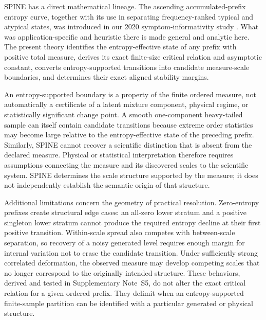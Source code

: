 \documentclass[aip,cha,reprint,superscriptaddress,floatfix]{revtex4-2}
\theoremstyle{definition}
\theoremstyle{remark}
\begin{document}
SPINE has a direct mathematical lineage. The ascending accumulated-prefix entropy curve, together with its use in separating frequency-ranked typical and atypical states, was introduced in our 2020 symptom-informativity study \cite{almomani2020symptoms}. What was application-specific and heuristic there is made general and analytic here. The present theory identifies the entropy-effective state of any prefix with positive total measure, derives its exact finite-size critical relation and asymptotic constant, converts entropy-supported transitions into candidate measure-scale boundaries, and determines their exact aligned stability margins. 

An entropy-supported boundary is a property of the finite ordered measure, not automatically a certificate of a latent mixture component, physical regime, or statistically significant change point. A smooth one-component heavy-tailed sample can itself contain candidate transitions because extreme order statistics may become large relative to the entropy-effective state of the preceding prefix. Similarly, SPINE cannot recover a scientific distinction that is absent from the declared measure. Physical or statistical interpretation therefore requires assumptions connecting the measure and its discovered scales to the scientific system. SPINE determines the scale structure supported by the measure; it does not independently establish the semantic origin of that structure.

Additional limitations concern the geometry of practical resolution. Zero-entropy prefixes create structural edge cases: an all-zero lower stratum and a positive singleton lower stratum cannot produce the required entropy decline at their first positive transition. Within-scale spread also competes with between-scale separation, so recovery of a noisy generated level requires enough margin for internal variation not to erase the candidate transition. Under sufficiently strong correlated deformation, the observed measure may develop competing scales that no longer correspond to the originally intended structure. These behaviors, derived and tested in Supplementary Note~S5, do not alter the exact critical relation for a given ordered prefix. They delimit when an entropy-supported finite-sample partition can be identified with a particular generated or physical structure.
\end{document}
